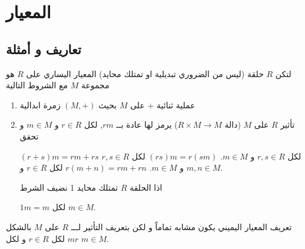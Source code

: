 \chapter{المعيار}

\section{تعاريف و أمثلة}

\begin{definition}
	لتكن $R$ حلقة (ليس من الضروري تبديلية او تمتلك محايد) المعيار اليساري على $R$ هو مجموعة $M$ مع الشروط التالية
	\begin{enumerate}
		\item عملية ثنائية + على $M$ بحيث $(M, +)$ زمرة ابدالية
		\item تأثير $R$ على $M$ (دالة $R\times M \to M$) يرمز لها عادة بــ $rm$, لكل $r\in R$ و $m\in M$ و تحقق
		\begin{tasks}
			\task $(r+s)m = rm + rs$ لكل $r,s\in R$ و $m\in M$.
			\task $(rs)m=r(sm)$ لكل $r,s\in R$ و $m\in M$.
			\task $r(m+n) = rm+rn$ لكل $r\in R$ و $m,n\in M$.
		\end{tasks}
		اذا الحلقة $R$ تمتلك محايد 1 نضيف الشرط
		\begin{tasks}[resume]
			\task $1m = m$ لكل $m\in M$.
		\end{tasks}
	\end{enumerate}
\end{definition}

تعريف المعيار اليميني يكون مشابه تماماً و لكن بتعريف التأثير لـــ $R$ على $M$ بالشكل $mr$  لكل $r\in R$ و لكل $m\in M$.

